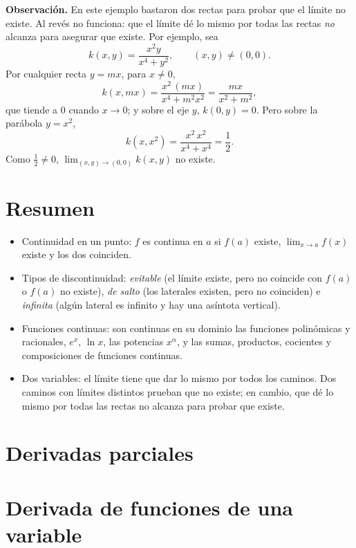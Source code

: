\documentclass{article}
\begin{document}
\noindent\textbf{Observación.} En este ejemplo bastaron dos rectas para probar que el límite no existe. Al revés no funciona: que el límite dé lo mismo por todas las rectas \emph{no} alcanza para asegurar que existe. Por ejemplo, sea
\[
k(x,y)=\frac{x^{2}y}{x^{4}+y^{2}},\qquad (x,y)\neq(0,0).
\]
Por cualquier recta \(y=mx\), para \(x\neq0\),
\[
k(x,mx)=\frac{x^{2}\,(mx)}{x^{4}+m^{2}x^{2}}=\frac{mx}{x^{2}+m^{2}},
\]
que tiende a \(0\) cuando \(x\to0\); y sobre el eje \(y\), \(k(0,y)=0\). Pero sobre la parábola \(y=x^{2}\),
\[
k(x,x^{2})=\frac{x^{2}\,x^{2}}{x^{4}+x^{4}}=\frac{1}{2}.
\]
Como \(\tfrac{1}{2}\neq0\), \(\displaystyle \lim_{(x,y)\to(0,0)}k(x,y)\) no existe.


\section*{Resumen}
\begin{itemize}
  \item {\color{teal}Continuidad en un punto:} \(f\) es continua en \(a\) si \(f(a)\) existe, \(\displaystyle\lim_{x\to a}f(x)\) existe y los dos coinciden.
  \item {\color{teal}Tipos de discontinuidad:} \emph{evitable} (el límite existe, pero no coincide con \(f(a)\) o \(f(a)\) no existe), \emph{de salto} (los laterales existen, pero no coinciden) e \emph{infinita} (algún lateral es infinito y hay una asíntota vertical).
  \item {\color{teal}Funciones continuas:} son continuas en su dominio las funciones polinómicas y racionales, \(e^{x}\), \(\ln x\), las potencias \(x^{\alpha}\), y las sumas, productos, cocientes y composiciones de funciones continuas.
  \item {\color{teal}Dos variables:} el límite tiene que dar lo mismo por todos los caminos. Dos caminos con límites distintos prueban que no existe; en cambio, que dé lo mismo por todas las rectas no alcanza para probar que existe.
\end{itemize}


\newpage


\section{Derivadas parciales}\label{cap:parciales}



\section*{Derivada de funciones de una variable}
\end{document}
